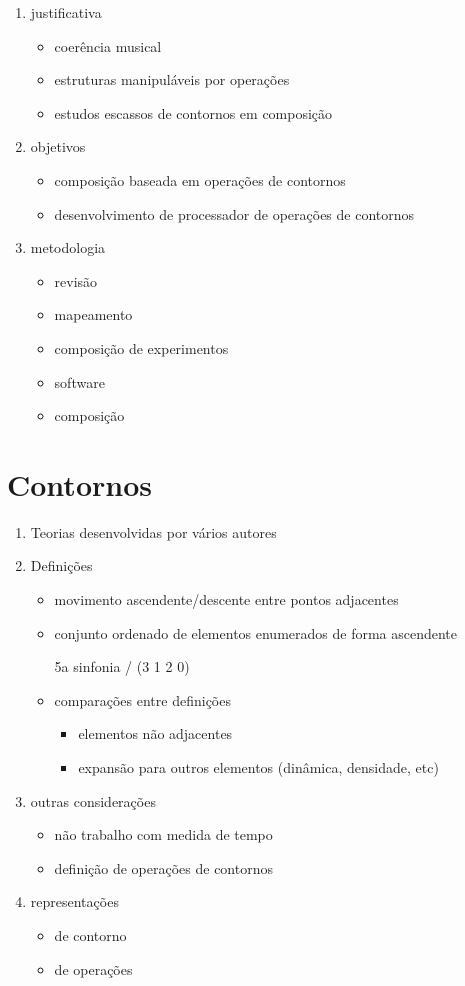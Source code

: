 \documentclass[12pt,a4paper]{article}
\begin{document}
\begin{enumerate}
\item justificativa
  \begin{itemize}
  \item coerência musical
  \item estruturas manipuláveis por operações
  \item estudos escassos de contornos em composição
  \end{itemize}
\item objetivos
  \begin{itemize}
  \item composição baseada em operações de contornos
  \item desenvolvimento de processador de operações de contornos
  \end{itemize}
\item metodologia
  \begin{itemize}
  \item revisão
  \item mapeamento
  \item composição de experimentos
  \item software
  \item composição
  \end{itemize}
\end{enumerate}

\section{Contornos}

\begin{enumerate}
\item Teorias desenvolvidas por vários autores
\item Definições
  \begin{itemize}
  \item movimento ascendente/descente entre pontos adjacentes 

  \item conjunto ordenado de elementos enumerados de forma ascendente

    5a sinfonia / (3 1 2 0)
  \item comparações entre definições
    \begin{itemize}
    \item elementos não adjacentes
    \item expansão para outros elementos (dinâmica, densidade, etc)
    \end{itemize}
  \end{itemize}
\item outras considerações
  \begin{itemize}
  \item não trabalho com medida de tempo
  \item definição de operações de contornos
  \end{itemize}
\item representações
  \begin{itemize}
  \item de contorno
  \item de operações
  \end{itemize}
\end{enumerate}
\end{document}
